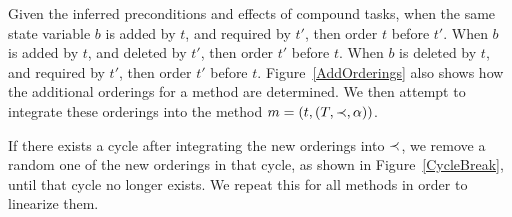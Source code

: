 Given the inferred preconditions and effects of compound tasks, when the same state variable $b$ is added by $t$,  and required by $t'$, then order $t$ before $t'$. When $b$ is added by $t$,  and deleted by $t'$, then order $t'$ before $t$. When $b$ is deleted by $t$, and required by $t'$, then order $t'$ before $t$. Figure~\ref{AddOrderings} also shows how the additional orderings for a method are determined. We then attempt to integrate these orderings into the method $m = (t, (T, \mathit{ \mathord{\prec} }, \alpha))$. 

If there exists a cycle after integrating the new orderings into $\mathit{ \mathord{\prec} }$, we remove a random one of the new orderings in that cycle, as shown in Figure~\ref{CycleBreak}, until that cycle no longer exists.
We repeat this for all methods in order to linearize them.


